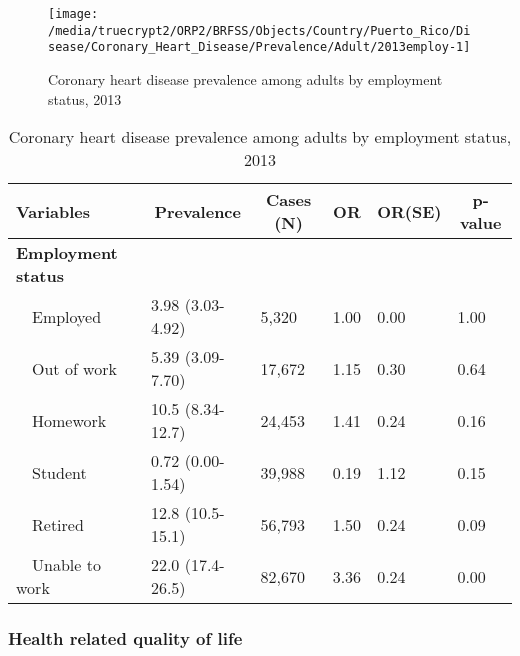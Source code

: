 \begin{figure}[H]
\caption{Coronary heart disease prevalence among adults by employment status, 
         2013}
\label{fig:employ.Coronary_Heart_Disease.2013}
\begin{knitrout}
\color{fgcolor}

{\centering \texttt{[image: /media/truecrypt2/ORP2/BRFSS/Objects/Country/Puerto\_Rico/Disease/Coronary\_Heart\_Disease/Prevalence/Adult/2013employ-1]} 

}



\end{knitrout}
 \end{figure}

\begin{table}[H]
\caption{Coronary heart disease prevalence  among adults by employment status, 2013\label{tab:employ.Coronary_Heart_Disease.2013}} 
\begin{center}
\begin{tabular}{llllll}
\hline\hline
\multicolumn{1}{l}{Variables}&\multicolumn{1}{c}{Prevalence}&\multicolumn{1}{c}{Cases (N)}&\multicolumn{1}{c}{OR}&\multicolumn{1}{c}{OR(SE)}&\multicolumn{1}{c}{p-value}\tabularnewline
\hline
{\bfseries Employment status}&&&&&\tabularnewline
~~Employed&3.98 (3.03-4.92)& 5,320&1.00&0.00&1.00\tabularnewline
~~Out of work&5.39 (3.09-7.70)&17,672&1.15&0.30&0.64\tabularnewline
~~Homework&10.5 (8.34-12.7)&24,453&1.41&0.24&0.16\tabularnewline
~~Student&0.72 (0.00-1.54)&39,988&0.19&1.12&0.15\tabularnewline
~~Retired&12.8 (10.5-15.1)&56,793&1.50&0.24&0.09\tabularnewline
~~Unable to work&22.0 (17.4-26.5)&82,670&3.36&0.24&0.00\tabularnewline
\hline
\end{tabular}\end{center}

\end{table}


 \newpage
\subsubsection{Health related quality of life}


